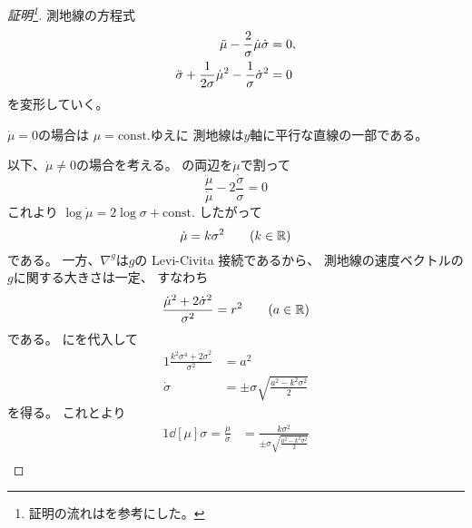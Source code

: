 \documentclass[report]{jlreq}
\begin{document}
\begin{proof}[証明\footnote{
    証明の流れは\cite[Chap.3 14.4]{Tu17}を参考にした。
}]
    測地線の方程式
    \begin{alignat}{1}
        \ddot{\mu}
            - \frac{2}{\sigma} \dot{\mu} \dot{\sigma}
            &= 0,
            \locallabel{eq:1}
            \\
        \ddot{\sigma}
            + \frac{1}{2 \sigma} \dot{\mu}^2
            - \frac{1}{\sigma} \dot{\sigma}^2
            &= 0
            \locallabel{eq:2}
    \end{alignat}
    を変形していく。

    $\dot{\mu} = 0$の場合は
    $\mu = \text{const.}$ゆえに
    測地線は$y$軸に平行な直線の一部である。

    以下、$\dot{\mu} \neq 0$の場合を考える。
    の両辺を$\dot{\mu}$で割って
    \begin{equation}
        \frac{\ddot{\mu}}{\dot{\mu}}
            - 2\frac{\dot{\sigma}}{\sigma}
            = 0
    \end{equation}
    これより
    $\log \dot{\mu} = 2 \log \sigma + \text{const.}$
    したがって
    \begin{equation}
        \dot{\mu} = k \sigma^2
            \qquad
            (k \in \R)
            \locallabel{eq:3}
    \end{equation}
    である。
    一方、$\nabla^g$は$g$の Levi-Civita 接続であるから、
    測地線の速度ベクトルの$g$に関する大きさは一定、
    すなわち
    \begin{equation}
        \frac{\dot{\mu}^2 + 2 \dot{\sigma}^2}{\sigma^2}
            = r^2
            \qquad
            (a \in \R)
            \locallabel{eq:4}
    \end{equation}
    である。
    にを代入して
    \begin{alignat}{1}
        \frac{k^2 \sigma^4 + 2 \dot{\sigma}^2}{\sigma^2}
            &=
                a^2
                \\
        \dot{\sigma}
            &=
                \pm \sigma \sqrt{\frac{a^2 - k^2 \sigma^2}{2}}
    \end{alignat}
    を得る。
    これとより
    \begin{alignat}{1}
        \dd[\mu]{\sigma}
            =
                \frac{\dot{\mu}}{\dot{\sigma}}
            &=
                \frac{k \sigma^2}{\pm \sigma \sqrt{\frac{a^2 - k^2 \sigma^2}{2}}}
                \\

\end{alignat}
\end{proof}
\end{document}
